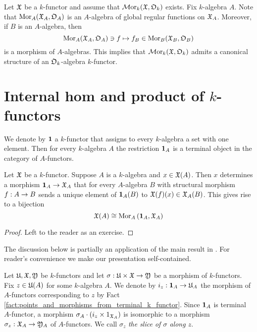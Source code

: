 \begin{example}\label{example:regular_functions_as_an_algebra_over_structure_algebra}
Let ${\mathfrak X}$ be a $k$-functor and assume that $\mathcal{M}\mathrm{or}_k({\mathfrak X},{\mathfrak O}_k)$ exists. Fix $k$-algebra $A$. Note that $\mathrm{Mor}_A({\mathfrak X}_A,{\mathfrak O}_A)$ is an $A$-algebra of global regular functions on ${\mathfrak X}_A$. Moreover, if $B$ is an $A$-algebra, then
$$\mathrm{Mor}_A({\mathfrak X}_A,{\mathfrak O}_A) \ni f \mapsto f_B\in \mathrm{Mor}_B({\mathfrak X}_B,{\mathfrak O}_B)$$
is a morphism of $A$-algebras. This implies that $\mathcal{M}\mathrm{or}_k({\mathfrak X},{\mathfrak O}_k)$ admits a canonical structure of an ${\mathfrak O}_k$-algebra $k$-functor.
\end{example}

\section{Internal hom and product of $k$-functors}
\noindent
We denote by $\mathbf{1}$ a $k$-functor that assigns to every $k$-algebra a set with one element. Then for every $k$-algebra $A$ the restriction $\mathbf{1}_A$ is a terminal object in the category of $A$-functors.

\begin{fact}\label{fact:points_and_morphisms_from_terminal_k_functor}
Let ${\mathfrak X}$ be a $k$-functor. Suppose $A$ is a $k$-algebra and $x\in {\mathfrak X}(A)$. Then $x$ determines a morphism $\mathbf{1}_{A}\rightarrow {\mathfrak X}_A$ that for every $A$-algebra $B$ with structural morphism $f:A\rightarrow B$ sends a unique element of $\mathbf{1}_{A}(B)$ to ${\mathfrak X}(f)(x)\in {\mathfrak X}_A(B)$. This gives rise to a bijection
$${\mathfrak X}(A)\cong \mathrm{Mor}_{A}\left(\mathbf{1}_{A},{\mathfrak X}_A\right)$$
\end{fact}
\begin{proof}
Left to the reader as an exercise.
\end{proof}
\noindent
The discussion below is partially an application of the main result in {\cite[section 6]{Presheaves}}. For reader's convenience we make our presentation self-contained.

\begin{definition}
Let ${\mathfrak U},{\mathfrak X},{\mathfrak Y}$ be $k$-functors and let $\sigma:{\mathfrak U}\times {\mathfrak X}\rightarrow {\mathfrak Y}$ be a morphism of $k$-functors. Fix $z\in {\mathfrak U}(A)$ for some $k$-algebra $A$. We denote by $i_z:\mathbf{1}_A\rightarrow {\mathfrak U}_A$ the morphism of $A$-functors corresponding to $z$ by Fact \ref{fact:points_and_morphisms_from_terminal_k_functor}. Since $\mathbf{1}_A$ is terminal $A$-functor, a morphism $\sigma_A\cdot \left(i_z\times 1_{{\mathfrak X}_A}\right)$ is isomorphic to a morphism $\sigma_z:{\mathfrak X}_A\rightarrow {\mathfrak Y}_A$ of $A$-functors. We call $\sigma_z$ \textit{the slice of $\sigma$ along $z$}.
\end{definition}

